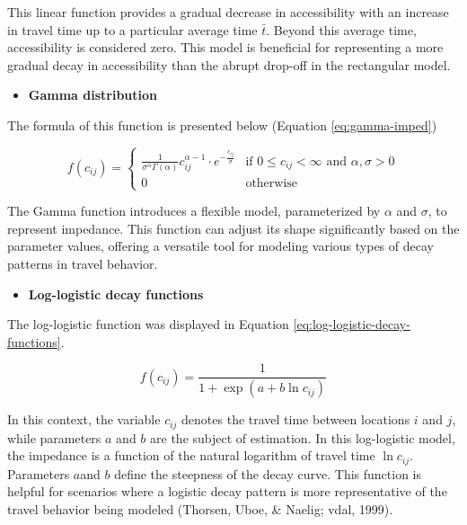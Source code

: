 \documentclass[
11pt, %
oneside, %
english, %
singlespacing, %
]{macthesis} %
\def\tightlist{}
\begin{document}
This linear function provides a gradual decrease in accessibility with an increase in travel time up to a particular average time \(\bar{t}\). Beyond this average time, accessibility is considered zero. This model is beneficial for representing a more gradual decay in accessibility than the abrupt drop-off in the rectangular model.

\begin{itemize}
\tightlist
\item
  \textbf{Gamma distribution}
\end{itemize}

The formula of this function is presented below (Equation \eqref{eq:gamma-imped})

\begin{equation}
f(c_{ij}) = 
\begin{cases}
\frac{1}{\sigma^\alpha\Gamma(\alpha)} c_{ij}^{\alpha-1} \cdot e^{-\frac{c_{ij}}{\sigma}} & \text{if } 0 \leq c_{ij} < \infty  \text{ and } \alpha, \sigma > 0 \\
0 & \text{otherwise}
\end{cases}
\label{eq:gamma-imped}
\end{equation}

The Gamma function introduces a flexible model, parameterized by \(\alpha\) and \(\sigma\), to represent impedance. This function can adjust its shape significantly based on the parameter values, offering a versatile tool for modeling various types of decay patterns in travel behavior.

\begin{itemize}
\tightlist
\item
  \textbf{Log-logistic decay functions}
\end{itemize}

The log-logistic function was displayed in Equation \eqref{eq:log-logistic-decay-functions}.

\begin{equation}
f(c_{ij}) = \frac {1}{1+ \exp(a + b\ln c_{ij})}
\label{eq:log-logistic-decay-functions}
\end{equation}

In this context, the variable \(c_{ij}\) denotes the travel time between locations \(i\) and \(j\), while parameters \(a\) and \(b\) are the subject of estimation. In this log-logistic model, the impedance is a function of the natural logarithm of travel time \(\ln c_{ij}\). Parameters \(a\)and \(b\) define the steepness of the decay curve. This function is helpful for scenarios where a logistic decay pattern is more representative of the travel behavior being modeled (Thorsen, Uboe, \& Naelig; vdal, 1999).
\end{document}
